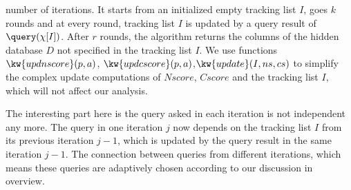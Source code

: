 \begin{example}
number of iterations.
It starts from an initialized empty tracking list $I$,
{ goes $k$ rounds and at every round, tracking list $I$ is updated by a query result of $\query(\chi[I])$.
After $r$ rounds, the algorithm returns the columns of the hidden database $D$ not specified in the tracking list $I$.
We use functions $\kw{updnscore}(p,a)$,
$\kw{updcscore}(p,a)$,$\kw{update}(I,ns,cs)$ to simplify the complex update computations of $Nscore$, $Cscore$ and the tracking list $I$, 
which will not affect our analysis.%
}

{The interesting part here is the query asked in each iteration is not independent any more. 
The query in one iteration $j$ now depends on the tracking list $I$ from its previous iteration $j-1$, which is updated by the query result in the same iteration $j-1$. The connection between queries from different iterations, 
 which means these queries are adaptively chosen according to our discussion in overview.
}


\end{example}
